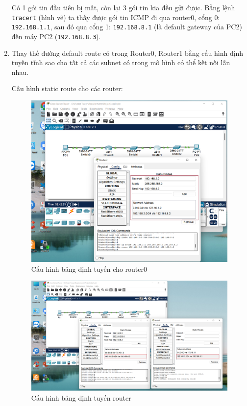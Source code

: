 \begin{enumerate}
Có 1 gói tin đầu tiên bị mất, còn lại 3 gói tin kia đều gửi được. Bằng lệnh \texttt{tracert} (hình vẽ) ta thấy được gói tin ICMP đi qua router0, cổng 0: \texttt{192.168.1.1}, sau đó qua cổng 1: \texttt{192.168.8.1} (là default gateway của PC2) đến máy PC2 (\texttt{192.168.8.3}).


\bf \item Thay thế đường default route có trong Router0, Router1 bằng cấu hình định tuyến tĩnh sao cho tất cả các subnet có trong mô hình có thể kết nối lẫn nhau.

\rm Cấu hình static route cho các router:

\begin{figure}[H]
\begin{center}
\includegraphics[scale=0.4]{../figures/p1/p1-4a}
\end{center}
\caption{Cấu hình bảng định tuyến cho router0}
\end{figure}

\begin{figure}[H]
\begin{center}
\includegraphics[scale=0.4]{../figures/p1/p1-4b}
\end{center}
\caption{Cấu hình bảng định tuyến router}
\end{figure}


\end{enumerate}
